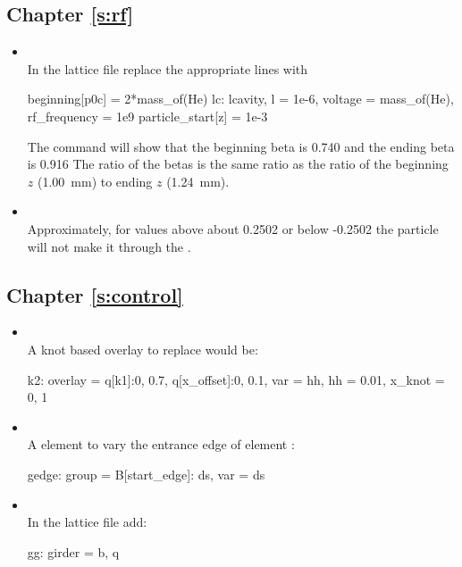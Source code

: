 \documentclass{hitec}     %
\begin{document}
{{{{%
\subsection{Chapter \ref{s:rf}}   %

\begin{itemize}[leftmargin=*]
%
\item[]\hspace*{-24pt} \\
In the  lattice file replace the appropriate lines with
\begin{code}
beginning[p0c] = 2*mass_of(He)
lc: lcavity, l = 1e-6, voltage = mass_of(He), rf_frequency = 1e9
particle_start[z] = 1e-3
\end{code}
The command  will show that the beginning beta is 0.740 and the ending beta is 0.916
The ratio of the betas is the same ratio as the ratio of the beginning $z$ (1.00~mm) to ending $z$
(1.24~mm).
%
\item[]\hspace*{-24pt} \\
Approximately, for  values above about 0.2502 or below -0.2502 the particle will not
make it through the .
\end{itemize}


\subsection{Chapter \ref{s:control}}   %

\begin{itemize}[leftmargin=*]
\item[]\hspace*{-24pt} \\
A knot based overlay to replace  would be:
\begin{code}
k2: overlay = {q[k1]:{0, 0.7}, q[x_offset]:{0, 0.1}}, 
                      var = {hh}, hh = 0.01, x_knot = {0, 1}
\end{code}
%
\item[]\hspace*{-24pt} \\
A  element to vary the entrance edge of element :
\begin{code}
gedge: group = {B[start_edge]: ds}, var = {ds}
\end{code}
%
\item[]\hspace*{-24pt} \\
In the  lattice file add:
\begin{code}
gg: girder = {b, q}
\end{code}
\end{itemize}

}}}}
\end{document}
